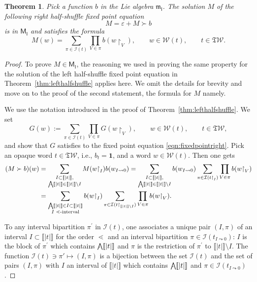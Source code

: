 \documentclass[pdftex]{sigma}
\newcommand{\interval}[1]{\llbracket #1 \rrbracket}
\renewcommand{\restriction}[2]{{#1\mathbin{\upharpoonright}_{#2}}}
\newcommand{\translucidation}[2]{{{#1}_{#2\leadsto0}}}
\newcommand{\stdl}{\lessdot}
\newcommand{\bigwedgedot}{{\mathop{\bigwedge\hspace{-7.8pt}\raisebox{-1pt}[0pt][0pt]{$\cdot$}\hspace{3pt}}\nolimits}}
\newcommand{\bigwedgedots}{{\mathop{\bigwedge\hspace{-6.5pt}\raisebox{-1.5pt}[0pt][0pt]{$\cdot$}\hspace{2pt}}\nolimits}}
\newcommand{\SWc}{{\mathfrak{T}\mathcal{W}}}
\newcommand\IWc{\mathcal{W}}
\def\BBc{{\mathcal{I}}}
\newcommand\shgrI{{\mathsf M}_{\mathsf I}}
\newcommand\shalI{{\mathfrak m}_{\mathsf I}}
\numberwithin{equation}{section}
\newtheorem{Theorem}{Theorem}[section]
\begin{document}
\begin{Theorem}
	Pick a function $b$ in the Lie algebra $\shalI$. The solution $M$ of the following right half-shuffle fixed point equation
	\begin{equation}
		\label{eqn:fixedpointright}
		M = \varepsilon + M \succ b
	\end{equation}
	is in $\shgrI$ and satisfies the formula
	\begin{equation*}%
		M(w) = \sum_{\pi \in \BBc(t)} \prod_{V\in\pi}b(\restriction{w}{V}),\qquad w\in \IWc(t),\qquad t\in \SWc.
	\end{equation*}
\end{Theorem}
\begin{proof}
	To prove $M\in \shgrI$, the reasoning we used in proving the same property for the solution of the left half-shuffle fixed point equation in Theorem~\ref{thm:lefthalfshuffle} applies here. We omit the details for brevity and move on to the proof of the second statement, the formula for $M$ namely.

	We use the notation introduced in the proof of Theorem~\ref{thm:lefthalfshuffle}. We set
	\begin{equation*}
		G(w) := \sum_{\pi\in\BBc(t)}\prod_{V\in \pi}G(\restriction{w}{V}),\qquad w \in \IWc(t),\qquad t\in\SWc,
	\end{equation*}
	and show that $G$ satisfies to the fixed point equation \eqref{eqn:fixedpointright}. Pick an opaque word $t \in \SWc$, i.e., $b_t = \mathbf{1}$, and a word $w\in\IWc(t)$. Then one gets
	\begin{align}
		\label{eqn:recright}
		(M\succ b)(w) & = \sum_{\substack{I \subset \llbracket |t| \rrbracket,\\ \bigwedgedots\interval{|t|} \in \interval{|t|}\setminus I}} M(\restriction{w}{I})b(\translucidation{w}{I}) = \sum_{\substack{I \subset \interval{|t|},\\ \bigwedgedots\interval{|t|} \in \interval{|t|}\setminus I}} b(\translucidation{w}{I}) \sum_{\pi \in \BBc(\restriction{t}{I})} \prod_{V\in\pi}b(\restriction{w}{V}) \nonumber \\
		 & =\sum_{\substack{\bigwedgedots\interval{|t|}\in I\subset \interval{|t|} \\ I\text{ $\stdl$-interval}}} b(\restriction{w}{I})\sum_{\pi \in \BBc(\restriction{t}{\interval{|t|}\setminus I})} \prod_{V\in\pi}b(\restriction{w}{V}).
	\end{align}

	To any interval bipartition $\pi^{\prime}$ in $\BBc(t)$, one associates a unique pair $(I,\pi)$ of an interval $I\subset \interval{|t|}$ for the order $\stdl$ and an interval bipartition $\pi \in \BBc(\translucidation{t}{I})$: $I$ is the block of $\pi^{\prime}$ which contains $\bigwedgedot \llbracket |t| \rrbracket$
	and $\pi$ is the restriction of $\pi^{\prime}$ to $\llbracket |t| \rrbracket\setminus I$. The function
	$\BBc(t) \ni \pi' \mapsto (I, \pi) $
	is a bijection between the set $\BBc(t)$ and the set of pairs $(I,\pi)$ with $I$ an interval of $\llbracket |t| \rrbracket$ which contains $\bigwedgedot \llbracket |t| \rrbracket$ and $\pi \in \BBc(\translucidation{t}{I})$.


\end{proof}
\end{document}
